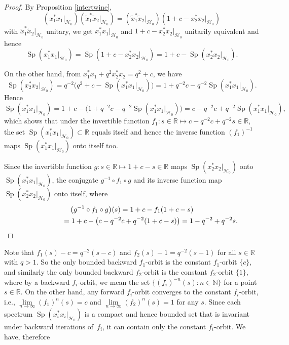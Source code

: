 \documentclass[11pt]{article}
\numberwithin{equation}{section}
\begin{document}
\begin{proof} By Proposition \ref{intertwine},
\[
( x_{1}^{\ast}x_{1}|_{\mathcal{H}_{0}}) ( \tilde{x}%
_{1}^{\ast}\tilde{x}_{2}|_{\mathcal{H}_{0}}) =( \tilde{x}%
_{1}^{\ast}\tilde{x}_{2}|_{\mathcal{H}_{0}}) ( 1+c-x_{2}^{\ast
}x_{2}|_{\mathcal{H}_{0}})
\]
with $\tilde{x}_{1}^{\ast}\tilde{x}_{2}|_{\mathcal{H}_{0}}$ unitary, we get
$x_{1}^{\ast}x_{1}|_{\mathcal{H}_{0}}$ and $1+c-x_{2}^{\ast}x_{2}%
|_{\mathcal{H}_{0}}$ unitarily equivalent and hence
\[
\operatorname{Sp}( x_{1}^{\ast}x_{1}|_{\mathcal{H}_{0}})
=\operatorname{Sp}( 1+c-x_{2}^{\ast}x_{2}|_{\mathcal{H}_{0}})
=1+c-\operatorname{Sp}( x_{2}^{\ast}x_{2}|_{\mathcal{H}_{0}}) .
\]

On the other hand, from $x_{1}^{\ast}x_{1}+q^{2}x_{2}^{\ast}x_{2}=q^{2}+c$, we
have
\[
\operatorname{Sp}( x_{2}^{\ast}x_{2}|_{\mathcal{H}_{0}})
=q^{-2}\big( q^{2}+c-\operatorname{Sp}( x_{1}^{\ast}x_{1}
|_{\mathcal{H}_{0}}) \big) =1+q^{-2}c-q^{-2}\operatorname{Sp}
( x_{1}^{\ast}x_{1}|_{\mathcal{H}_{0}}) .
\]
Hence
\[
\operatorname{Sp}( x_{1}^{\ast}x_{1}|_{\mathcal{H}_{0}})
=1+c-\big( 1+q^{-2}c-q^{-2}\operatorname{Sp}( x_{1}^{\ast}
x_{1}|_{\mathcal{H}_{0}}) \big) =c-q^{-2}c+q^{-2}\operatorname{Sp}
( x_{1}^{\ast}x_{1}|_{\mathcal{H}_{0}}) ,
\]
which shows that under the invertible function $f_{1}\colon s\in\mathbb{R}\mapsto
c-q^{-2}c+q^{-2}s\in\mathbb{R}$, the set $\operatorname{Sp}(
x_{1}^{\ast}x_{1}|_{\mathcal{H}_{0}}) \subset\mathbb{R}$ equals itself
and hence the inverse function $( f_{1}) ^{-1}$ maps
$\operatorname{Sp}( x_{1}^{\ast}x_{1}|_{\mathcal{H}_{0}}) $ onto
itself too.

Since the invertible function $g\colon s\in\mathbb{R}\mapsto1+c-s\in\mathbb{R}$ maps
$\operatorname{Sp}( x_{2}^{\ast}x_{2}|_{\mathcal{H}_{0}}) $ onto
$\operatorname{Sp}( x_{1}^{\ast}x_{1}|_{\mathcal{H}_{0}}) $, the
conjugate $g^{-1}\circ f_{1}\circ g$ and its inverse function map
$\operatorname{Sp}( x_{2}^{\ast}x_{2}|_{\mathcal{H}_{0}}) $ onto
itself, where
\begin{gather*}
\big( g^{-1}\circ f_{1}\circ g\big) (s) =1+c-f_{1}(1+c-s)\\
\hphantom{\big( g^{-1}\circ f_{1}\circ g\big) (s)}{}
=1+c-\big( c-q^{-2}c+q^{-2} ( 1+c-s ) \big) =1-q^{-2}%
+q^{-2}s.\tag*{\qed}
\end{gather*}\renewcommand{\qed}{}
\end{proof}

Note that $f_{1}(s) -c=q^{-2}(s-c) $ and
$f_{2}(s) -1=q^{-2}(s-1) $ for all $s\in
\mathbb{R}$ with $q>1$. So the only bounded backward $f_{1}$-orbit is the
constant $f_{1}$-orbit $\{c\} $, and similarly the only bounded
backward $f_{2}$-orbit is the constant $f_{2}$-orbit $\{1\} $,
where by a backward $f_{i}$-orbit, we mean the set $ \{ (
f_{i} ) ^{-n}(s) \colon n\in\mathbb{N} \} $ for a point
$s\in\mathbb{R}$. On the other hand, any forward $f_{i}$-orbit converges to
the constant $f_{i}$-orbit, i.e., $\lim\limits_{n\rightarrow\infty}(
f_{1}) ^{n}(s) =c$ and $\lim\limits_{n\rightarrow\infty}(
f_{2}) ^{n}(s) =1$ for any $s$. Since each spectrum $\operatorname{Sp}( x_{i}^{\ast}%
x_{i}|_{\mathcal{H}_{0}}) $ is a compact and hence bounded set that is
invariant under backward iterations of~$f_{i}$, it can contain only the
constant $f_{i}$-orbit. We have, therefore
\end{document}
